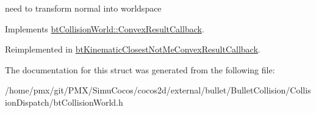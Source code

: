 need to transform normal into worldspace 

Implements \hyperlink{structbtCollisionWorld_1_1ConvexResultCallback}{bt\+Collision\+World\+::\+Convex\+Result\+Callback}.



Reimplemented in \hyperlink{classbtKinematicClosestNotMeConvexResultCallback_a793706b7811ea2d917349ed1501a77a5}{bt\+Kinematic\+Closest\+Not\+Me\+Convex\+Result\+Callback}.



The documentation for this struct was generated from the following file\+:\begin{DoxyCompactItemize}
\item 
/home/pmx/git/\+P\+M\+X/\+Simu\+Cocos/cocos2d/external/bullet/\+Bullet\+Collision/\+Collision\+Dispatch/bt\+Collision\+World.\+h\end{DoxyCompactItemize}
